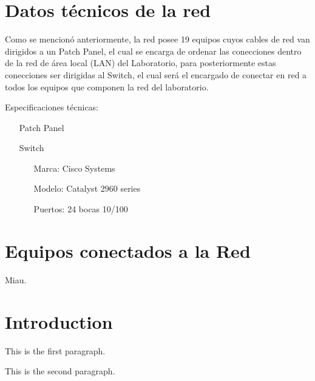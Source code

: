 \documentclass[spanish]{udpreport}
\begin{document}
\section {Datos técnicos de la red}
Como se mencionó anteriormente, la red posee 19 equipos cuyos cables de red van dirigidos a un Patch Panel, el cual se encarga de ordenar las conecciones dentro de la red de área local (LAN) del Laboratorio, para posteriormente estas conecciones ser dirigidas al Switch, el cual será el encargado de conectar en red a todos los equipos que componen la red del laboratorio.

Especificaciones técnicas:\\

 \begin{itemize}
    \vspace{4mm}
    \item[Patch Panel]
 \end{itemize}

 \begin{itemize}
    \item[Switch]
    \begin{itemize}
         \item[Marca:] Cisco Systems
         \item[Modelo:] Catalyst 2960 series
         \item[Puertos:] 24 bocas 10/100
    \end{itemize}
 \end{itemize}


\section{Equipos conectados a la Red}
Miau.

\section{Introduction}

This is the first paragraph.

\noindent This is the second paragraph.
\end{document}
